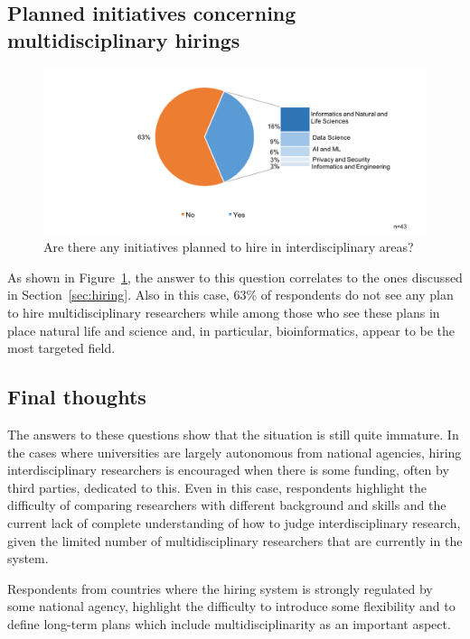 \subsection{Planned initiatives concerning multidisciplinary hirings}

\begin{figure}[h]
\centering
\includegraphics[width = \linewidth]{charts/3d.png}
\caption{Are there any initiatives planned to hire in interdisciplinary areas?}
\label{sect3:planned}
\end{figure}

As shown in Figure~\ref{sect3:planned}, the answer to this question correlates to the ones
discussed in Section~\ref{sec:hiring}. Also in this case, 63\% of
respondents do not see any plan to hire multidisciplinary researchers
while among those who see these plans in place natural life and
science and, in particular, bioinformatics, appear to be the most
targeted field. 

\subsection{Final thoughts}

The answers to these questions show that the situation is still quite
immature. In the cases where universities are largely autonomous from
national agencies, hiring interdisciplinary researchers is
encouraged when there is some funding, often by third parties, dedicated to
this. Even in this case, respondents highlight the difficulty of comparing
researchers with different background and skills and the current
lack of complete understanding of how to judge interdisciplinary research, given the limited
number of multidisciplinary researchers that are currently in the
system. 

Respondents from countries where the hiring system is strongly
regulated by some national agency, highlight the difficulty to
introduce some flexibility and to define long-term plans
which include multidisciplinarity as an important aspect. 
